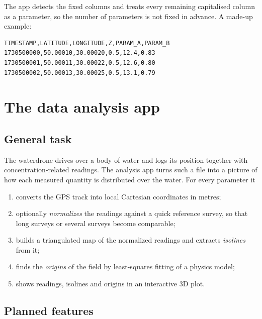 \documentclass{article}
\begin{document}
The app detects the fixed columns and treats every remaining capitalised
column as a parameter, so the number of parameters is not fixed in advance.
A made-up example:

\begin{lstlisting}
TIMESTAMP,LATITUDE,LONGITUDE,Z,PARAM_A,PARAM_B
1730500000,50.00010,30.00020,0.5,12.4,0.83
1730500001,50.00011,30.00022,0.5,12.6,0.80
1730500002,50.00013,30.00025,0.5,13.1,0.79
\end{lstlisting}

\section{The data analysis app}
\label{sec:app}

\subsection{General task}

The waterdrone drives over a body of water and logs its position together
with concentration-related readings. The analysis app turns such a file into
a picture of how each measured quantity is distributed over the water. For
every parameter it

\begin{enumerate}
\item converts the GPS track into local Cartesian coordinates in metres;
\item optionally \emph{normalizes} the readings against a quick reference
      survey, so that long surveys or several surveys become comparable;
\item builds a triangulated map of the normalized readings and extracts
      \emph{isolines} from it;
\item finds the \emph{origins} of the field by least-squares fitting of a
      physics model;
\item shows readings, isolines and origins in an interactive 3D plot.
\end{enumerate}

\subsection{Planned features}
\end{document}
